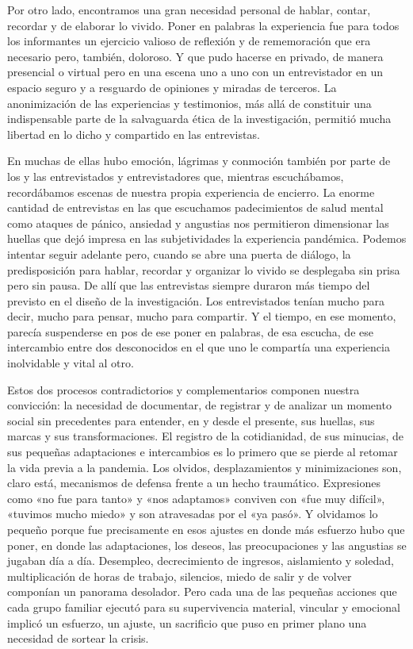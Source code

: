 Por otro lado, encontramos una gran necesidad personal de hablar, contar, recordar y de elaborar lo vivido. Poner en palabras la experiencia fue para todos los informantes un ejercicio valioso de reflexión y de rememoración que era necesario pero, también, doloroso. Y que pudo hacerse en privado, de manera presencial o virtual pero en una escena uno a uno con un entrevistador en un espacio seguro y a resguardo de opiniones y miradas de terceros. La anonimización de las experiencias y testimonios, más allá de constituir una indispensable parte de la salvaguarda ética de la investigación, permitió mucha libertad en lo dicho y compartido en las entrevistas.~

En muchas de ellas hubo emoción, lágrimas y conmoción también por parte de los y las entrevistados y entrevistadores que, mientras escuchábamos, recordábamos escenas de nuestra propia experiencia de encierro. La enorme cantidad de entrevistas en las que escuchamos padecimientos de salud mental como ataques de pánico, ansiedad y angustias nos permitieron dimensionar las huellas que dejó impresa en las subjetividades la experiencia pandémica. Podemos intentar seguir adelante pero, cuando se abre una puerta de diálogo, la predisposición para hablar, recordar y organizar lo vivido se desplegaba sin prisa pero sin pausa. De allí que las entrevistas siempre duraron más tiempo del previsto en el diseño de la investigación. Los entrevistados tenían mucho para decir, mucho para pensar, mucho para compartir. Y el tiempo, en ese momento, parecía suspenderse en pos de ese poner en palabras, de esa escucha, de ese intercambio entre dos desconocidos en el que uno le compartía una experiencia inolvidable y vital al otro.

Estos dos procesos contradictorios y complementarios componen nuestra convicción: la necesidad de documentar, de registrar y de analizar un momento social sin precedentes para entender, en y desde el presente, sus huellas, sus marcas y sus transformaciones. El registro de la cotidianidad, de sus minucias, de sus pequeñas adaptaciones e intercambios es lo primero que se pierde al retomar la vida previa a la pandemia. Los olvidos, desplazamientos y minimizaciones son, claro está, mecanismos de defensa frente a un hecho traumático. Expresiones como «no fue para tanto» y «nos adaptamos» conviven con «fue muy difícil», «tuvimos mucho miedo» y son atravesadas por el «ya pasó». Y olvidamos lo pequeño porque fue precisamente en esos ajustes en donde más esfuerzo hubo que poner, en donde las adaptaciones, los deseos, las preocupaciones y las angustias se jugaban día a día. Desempleo, decrecimiento de ingresos, aislamiento y soledad, multiplicación de horas de trabajo, silencios, miedo de salir y de volver componían un panorama desolador. Pero cada una de las pequeñas acciones que cada grupo familiar ejecutó para su supervivencia material, vincular y emocional implicó un esfuerzo, un ajuste, un sacrificio que puso en primer plano una necesidad de sortear la crisis.

